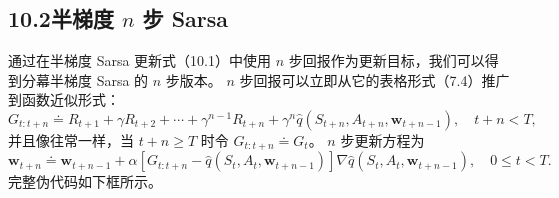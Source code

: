 \documentclass[UTF8,12pt,a4paper,fontset=fandol]{ctexart}
\begin{document}
\subsection*{10.2\quad 半梯度 $n$ 步 Sarsa}

通过在半梯度 Sarsa 更新式（10.1）中使用 $n$ 步回报作为更新目标，我们可以得到分幕半梯度 Sarsa 的 $n$ 步版本。
$n$ 步回报可以立即从它的表格形式（7.4）推广到函数近似形式：
\begin{equation}
G_{t:t+n}\doteq R_{t+1}+\gamma R_{t+2}+\cdots+\gamma^{n-1}R_{t+n}+\gamma^n\hat q(S_{t+n},A_{t+n},\mathbf{w}_{t+n-1}),\quad t+n<T,
\tag{10.4}
\end{equation}
并且像往常一样，当 $t+n\ge T$ 时令 $G_{t:t+n}\doteq G_t$。
$n$ 步更新方程为
\begin{equation}
\mathbf{w}_{t+n}\doteq \mathbf{w}_{t+n-1}+\alpha\left[G_{t:t+n}-\hat q(S_t,A_t,\mathbf{w}_{t+n-1})\right]\nabla\hat q(S_t,A_t,\mathbf{w}_{t+n-1}),\quad 0\le t<T.
\tag{10.5}
\end{equation}
完整伪代码如下框所示。
\end{document}
